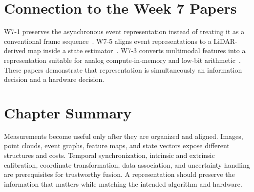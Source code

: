 \section{Connection to the Week 7 Papers}

W7-1 preserves the asynchronous event representation instead of treating it as a conventional frame sequence~\cite{gehrig2024lowlatency}. W7-5 aligns event representations to a LiDAR-derived map inside a state estimator~\cite{wang2025fastlieo}. W7-3 converts multimodal features into a representation suitable for analog compute-in-memory and low-bit arithmetic~\cite{ichikawa2024remcim}. These papers demonstrate that representation is simultaneously an information decision and a hardware decision.

\section{Chapter Summary}

Measurements become useful only after they are organized and aligned. Images, point clouds, event graphs, feature maps, and state vectors expose different structures and costs. Temporal synchronization, intrinsic and extrinsic calibration, coordinate transformation, data association, and uncertainty handling are prerequisites for trustworthy fusion. A representation should preserve the information that matters while matching the intended algorithm and hardware.

